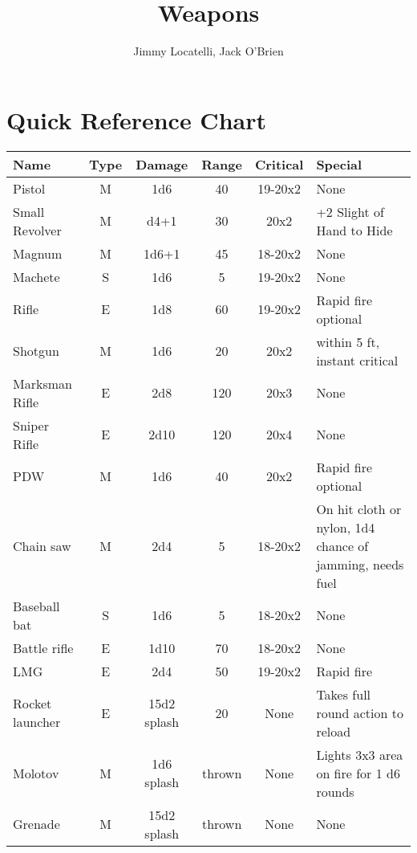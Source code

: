 \documentclass[12pt]{article}
\begin{document}
\title{Weapons}
\author{Jimmy Locatelli, Jack O'Brien}
\maketitle

\section{Quick Reference Chart}

\begin{tabular}{ | l | c | c | c | c | p{5cm} | }
Name & Type & Damage & Range & Critical & Special \\
\hline
Pistol & M & 1d6 & 40 & 19-20x2 & None \\
Small Revolver & M & d4+1 & 30 & 20x2 & +2 Slight of Hand to Hide \\ 
Magnum & M & 1d6+1 & 45 & 18-20x2 & None \\
Machete & S & 1d6 & 5 & 19-20x2 & None \\
Rifle & E & 1d8 & 60 & 19-20x2 & Rapid fire optional \\
Shotgun & M & 1d6 & 20 & 20x2 & within 5 ft, instant critical \\
Marksman Rifle & E & 2d8 & 120 & 20x3 & None \\
Sniper Rifle & E & 2d10 & 120 & 20x4 & None \\
PDW & M & 1d6 & 40 & 20x2 & Rapid fire optional \\
Chain saw & M & 2d4 & 5 & 18-20x2 & On hit cloth or nylon, 1d4 chance of jamming, needs fuel \\
Baseball bat & S & 1d6 & 5 & 18-20x2 & None \\
Battle rifle & E & 1d10 & 70 & 18-20x2 & None \\
LMG & E & 2d4 & 50 & 19-20x2 & Rapid fire \\
Rocket launcher & E & 15d2 splash & 20 & None & Takes full round action to reload\\
Molotov & M & 1d6 splash & thrown & None & Lights 3x3 area on fire for 1 d6 rounds\\
Grenade & M & 15d2 splash & thrown & None & None\\
\end{tabular}
\end{document}
